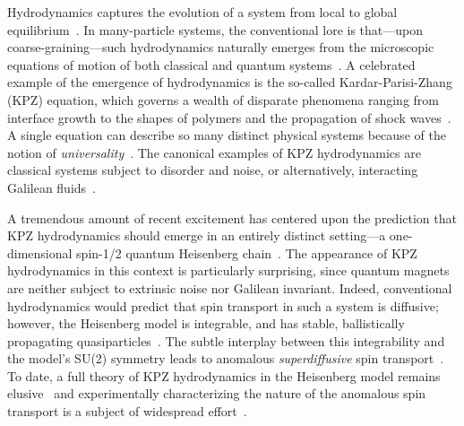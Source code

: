 \documentclass[
 reprint,
 superscriptaddress,
 amsmath,amssymb,
 aps,
 pra,
]{revtex4-2}
\begin{document}
Hydrodynamics captures the evolution of a system from local to global equilibrium~\cite{Spohn2012,Birkhoff2015}.
%
In many-particle systems, the conventional lore is that---upon coarse-graining---such hydrodynamics naturally emerges from the microscopic equations of motion of both classical and quantum systems~\cite{Wyatt2006,Mukerjee2006,Erdos2007,Castro-Alvaredo2016,Zu2021}.
%
A celebrated example of the emergence of hydrodynamics is the so-called Kardar-Parisi-Zhang (KPZ) equation, which governs a wealth of disparate phenomena ranging from interface growth to the shapes of polymers and the propagation of shock waves~\cite{Kardar1986,Halpin2015,Spohn2020}.
%
A single equation can describe so many distinct physical systems because of the notion of \emph{universality}~\cite{Kadanoff1990}.
%
The canonical examples of KPZ hydrodynamics are classical systems subject to disorder and noise, or alternatively, interacting Galilean fluids~\cite{Gubinelli2017}.


A tremendous amount of recent excitement has centered upon the prediction that KPZ hydrodynamics should emerge in an entirely distinct setting---a one-dimensional spin-1/2 quantum Heisenberg chain~\cite{Znidaric2011a,Ljubotina2017,Ljubotina2019,Gopalakrishnan2019a,DeNardis2019,Gopalakrishnan2019,Bulchandani2020a}.
%
The appearance of KPZ hydrodynamics in this context is particularly surprising, since quantum magnets are neither subject to extrinsic noise nor Galilean invariant.
%
Indeed, conventional hydrodynamics would predict that spin transport in such a system is diffusive; however, the Heisenberg model is integrable, and has stable, ballistically propagating quasiparticles~\cite{Castro-Alvaredo2016,Bertini2016,Ilievski2017,Bulchandani2018}.
%
The subtle interplay between this integrability and the model's SU(2) symmetry leads to anomalous \emph{superdiffusive} spin transport~\cite{Prosen2013,Das2019,Krajnik2020,Bulchandani2020a,Krajnik2020a,Ilievski2020}.
%
To date, a full theory of KPZ hydrodynamics in the Heisenberg model remains elusive~\cite{Bertini2021,Bulchandani2021} and experimentally characterizing the nature of the anomalous spin transport is a subject of widespread effort~\cite{Hild2014,Jepsen2020,Jepsen2021,Scheie2021}.


\end{document}
